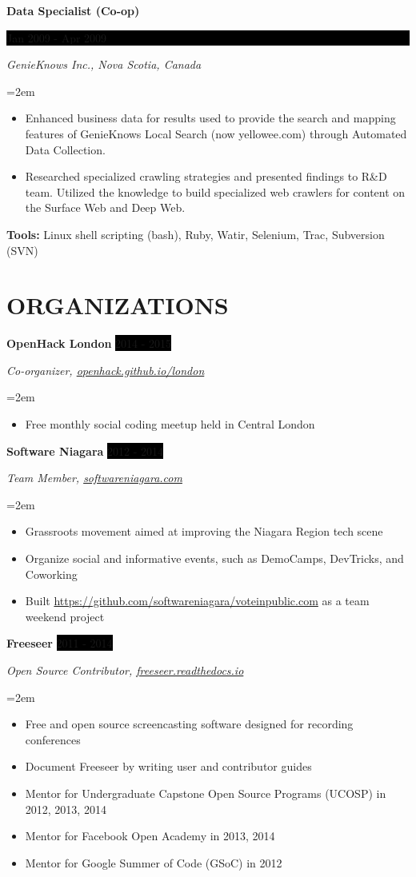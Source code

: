 \documentclass[paper=a4,fontsize=11pt]{scrartcl} %
\newcommand{\sepspace}{\vspace*{1em}}     %
\newcommand{\NewPart}[1]{\section*{\uppercase{#1}}}
\newcommand{\EducationEntry}[4]{
    \noindent \textbf{#1} \hfill        %
    \colorbox{Black}{
      \parbox{8.5em}{
      \hfill\color{White}#2}} \par      %
    \noindent \textit{#3} \par          %
    \noindent\hangindent=2em\hangafter=0 \small #4 %
    \normalsize \par}
\newcommand{\WorkEntry}[4]{             %
    \noindent \textbf{#1} \hfill        %
    \colorbox{Black}{%
      \parbox{9em}{%
      \hfill\color{White}#2}} \par      %
        \noindent \textit{#3} \par      %
    \noindent\hangindent=2em\hangafter=0 \small #4 %
    \normalsize \par}
\newcommand{\OrganizationEntry}[4]{         %
    \noindent \textbf{#1} \hfill            %
    \colorbox{Black}{\color{White}#2} \par  %
    \noindent \textit{#3} \par              %
    \noindent\hangindent=2em\hangafter=0 \small #4 %
    \normalsize \par}
\begin{document}
\WorkEntry{Data Specialist (Co-op)}{Jan 2009 - Apr 2009}
{GenieKnows Inc., Nova Scotia, Canada}
{
 \begin{itemize} \itemsep -1pt
   \item Enhanced business data for results used to provide the search and
         mapping features of GenieKnows Local Search (now yellowee.com)
         through Automated Data Collection.
   \item Researched specialized crawling strategies and presented findings to
         R\&D team. Utilized the knowledge to build specialized web
         crawlers for content on the Surface Web and Deep Web.
 \end{itemize}
 \textbf{Tools:} Linux shell scripting (bash), Ruby, Watir, Selenium, Trac, Subversion (SVN)
}

\NewPart{Organizations}{}

\OrganizationEntry{OpenHack London}{2014 - 2015} %
{Co-organizer, \href{https://openhack.github.io/london/}{openhack.github.io/london}}
{
  \begin{itemize} \itemsep -1pt
    \item Free monthly social coding meetup held in Central London
  \end{itemize}
}
\sepspace

\OrganizationEntry{Software Niagara}{2012 - 2014}
{Team Member, \href{https://www.softwareniagara.com/}{softwareniagara.com}}
{
 \begin{itemize} \itemsep -1pt
   \item Grassroots movement aimed at improving the Niagara Region tech scene
   \item Organize social and informative events, such as DemoCamps, DevTricks, and Coworking
   \item Built \url{https://github.com/softwareniagara/voteinpublic.com} as a team weekend project
 \end{itemize}
}
\sepspace

\OrganizationEntry{Freeseer}{2011 - 2014}
{Open Source Contributor, \href{http://freeseer.readthedocs.io/}{freeseer.readthedocs.io}}
{
 \begin{itemize} \itemsep -1pt %
   \item Free and open source screencasting software designed for recording conferences
   \item Document Freeseer by writing user and contributor guides
   \item Mentor for Undergraduate Capstone Open Source Programs (UCOSP) in 2012, 2013, 2014
   \item Mentor for Facebook Open Academy in 2013, 2014
   \item Mentor for Google Summer of Code (GSoC) in 2012
 \end{itemize}
}
\sepspace
\end{document}
